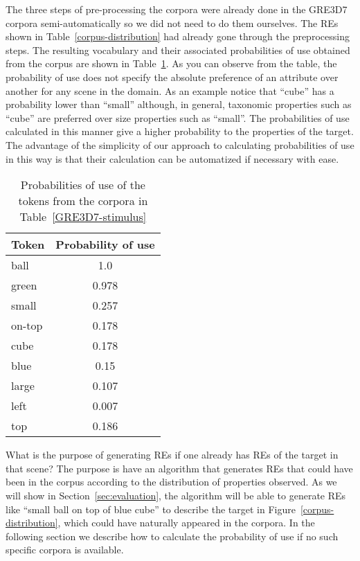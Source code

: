 The three steps of pre-processing the corpora were already done in the GRE3D7 corpora semi-automatically so we did not need to do them ourselves. The REs shown in Table~\ref{corpus-distribution} had already gone through the preprocessing steps. The resulting vocabulary and their associated probabilities of use obtained from the corpus are shown in Table~\ref{probability-of-use}. As you can observe from the table, the probability of use does not specify the absolute preference of an attribute over another for any scene in the domain. As an example notice that ``cube'' has a probability lower than ``small'' although, in general, taxonomic properties such as ``cube'' are preferred over size properties such as ``small''. The probabilities of use calculated in this manner give a higher probability to the properties of the target. The advantage of the simplicity of our approach to calculating probabilities of use in this way is that their calculation can be automatized if necessary with ease. 

\begin{table}[h!]
\begin{center}
\begin{tabular}{|l|c|}
\hline
Token & Probability of use \\
\hline
ball & 1.0 \\
green & 0.978 \\
small & 0.257 \\
on-top & 0.178 \\ 
cube & 0.178 \\
blue & 0.15 \\
large & 0.107 \\
left & 0.007 \\
top & 0.186 \\
\hline
\end{tabular}
\caption{Probabilities of use of the tokens from the corpora in Table~\ref{GRE3D7-stimulus}\label{probability-of-use}}
\end{center}
\end{table}

What is the purpose of generating REs if one already has REs of the target in that scene? The purpose is have an algorithm that generates REs that could have been in the corpus according to the distribution of properties observed. As we will show in Section~\ref{sec:evaluation}, the algorithm will be able to generate REs like ``small ball on top of blue cube'' to describe the target in Figure~\ref{corpus-distribution}, which could have naturally appeared in the corpora. In the following section we describe how to calculate the probability of use if no such specific corpora is available. 

